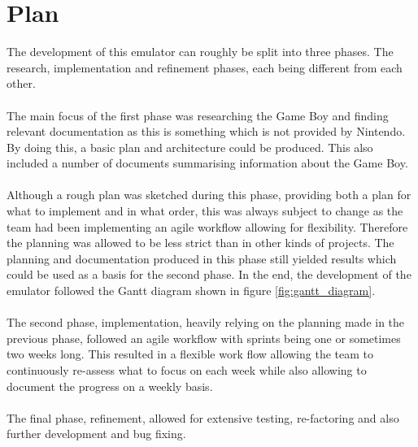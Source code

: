 
\section{Plan}
The development of this emulator can roughly be split into three phases. The research, implementation and refinement phases, each being different from each other.
\\\\
The main focus of the first phase was researching the Game Boy and finding relevant documentation as this is something which is not provided by Nintendo. By doing this, a basic plan and architecture could be produced. This also included a number of documents summarising information about the Game Boy.
\\\\
Although a rough plan was sketched during this phase, providing both a plan for what to implement and in what order, this was always subject to change as the team had been implementing an agile  workflow allowing for flexibility. Therefore the planning was allowed to be less strict than in other kinds of projects. The planning and documentation produced in this phase still yielded results which could be used as a basis for the second phase. In the end, the development of the emulator followed the Gantt diagram shown in figure \ref{fig:gantt_diagram}.
\\\\
The second phase, implementation, heavily relying on the planning made in the previous phase, followed an agile workflow with sprints being one or sometimes two weeks long. This resulted in a flexible work flow allowing the team to continuously re-assess what to focus on each week while also allowing to document the progress on a weekly basis.
\\\\
The final phase, refinement, allowed for extensive testing, re-factoring and also further development and bug fixing.
